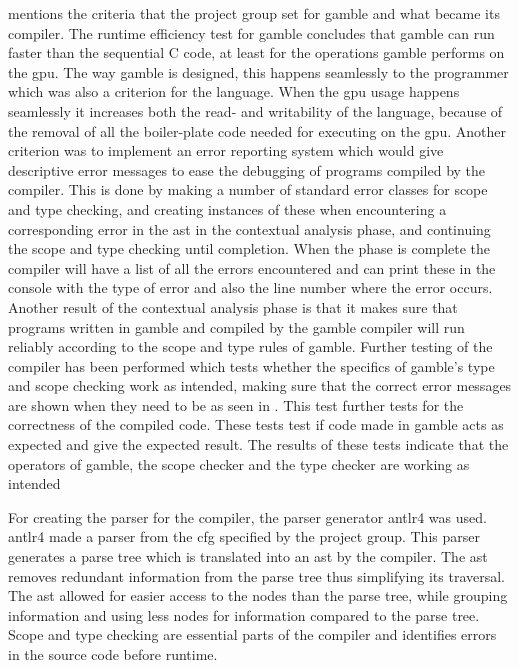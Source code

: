  mentions the criteria that the project group set for \gls{gamble} and what became its compiler.
The runtime efficiency test for \gls{gamble} concludes that \gls{gamble} can run faster than the sequential C code, at least for the operations \gls{gamble} performs on the \acrshort{gpu}.
The way \gls{gamble} is designed, this happens seamlessly to the programmer which was also a criterion for the language.
When the \acrshort{gpu} usage happens seamlessly it increases both the read- and writability of the language, because of the removal of all the boiler-plate code needed for executing on the \acrshort{gpu}.
Another criterion was to implement an error reporting system which would give descriptive error messages to ease the debugging of programs compiled by the compiler.
This is done by making a number of standard error classes for scope and type checking, and creating instances of these when encountering a corresponding error in the \acrshort{ast} in the contextual analysis phase, and continuing the scope and type checking until completion.
When the phase is complete the compiler will have a list of all the errors encountered and can print these in the console with the type of error and also the line number where the error occurs.
Another result of the contextual analysis phase is that it makes sure that programs written in \gls{gamble} and compiled by the \gls{gamble} compiler will run reliably according to the scope and type rules of \gls{gamble}.
Further testing of the compiler has been performed which tests whether the specifics of \gls{gamble}'s type and scope checking work as intended, making sure that the correct error messages are shown when they need to be as seen in .
This test further tests for the correctness of the compiled code.
These tests test if code made in \gls{gamble} acts as expected and give the expected result.
The results of these tests indicate that the operators of \gls{gamble}, the scope checker and the type checker are working as intended 

For creating the parser for the compiler, the parser generator \acrshort{antlr}4 was used.
\acrshort{antlr}4 made a parser from the \acrshort{cfg} specified by the project group.
This parser generates a parse tree which is translated into an \acrshort{ast} by the compiler.
The \acrshort{ast} removes redundant information from the parse tree thus simplifying its traversal.
The \acrshort{ast} allowed for easier access to the nodes than the parse tree, while grouping information and using less nodes for information compared to the parse tree.
Scope and type checking are essential parts of the compiler and identifies errors in the source code before runtime.


